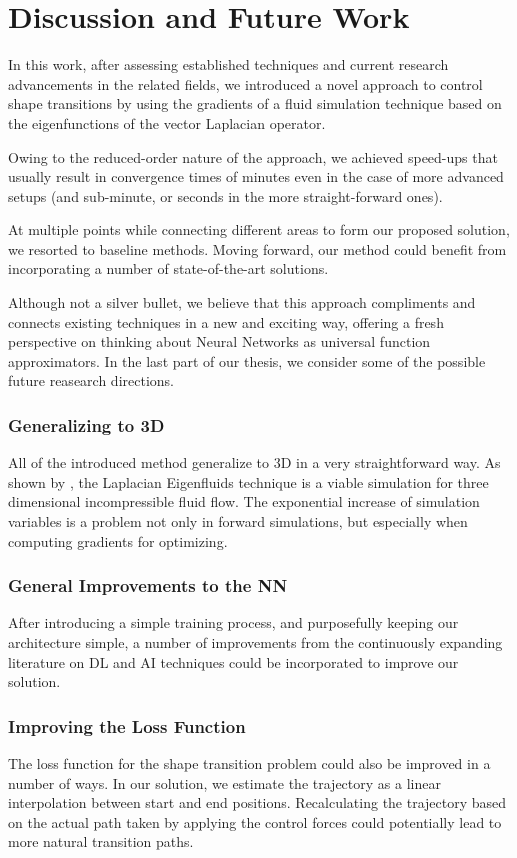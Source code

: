 \chapter{Discussion and Future Work}\label{chapter:discussion}
In this work, after assessing established techniques and current research
advancements in the related fields, we introduced a novel approach to control
shape transitions by using the gradients of a fluid simulation technique based
on the eigenfunctions of the vector Laplacian operator. 

Owing to the reduced-order nature of the approach, we achieved speed-ups that
usually result in convergence times of minutes even in the case of more advanced
setups (and sub-minute, or seconds in the more straight-forward ones).

At multiple points while connecting different areas to form our proposed
solution, we resorted to baseline methods. Moving forward, our method could
benefit from incorporating a number of state-of-the-art solutions.

Although not a silver bullet, we believe that this approach compliments and
connects existing techniques in a new and exciting way, offering a fresh
perspective on thinking about Neural Networks as universal function
approximators. In the last part of our thesis, we consider some of the possible
future reasearch directions. 

\subsection*{Generalizing to 3D}
All of the introduced method generalize to 3D in a very straightforward way. As
shown by \citet{scalable-eigenfluids}, the Laplacian Eigenfluids technique is
a viable simulation for three dimensional incompressible fluid flow. The
exponential increase of simulation variables is a problem not only in forward
simulations, but especially when computing gradients for optimizing. 

\subsection*{General Improvements to the NN}
After introducing a simple training process, and purposefully keeping our
architecture simple, a number of improvements from the continuously expanding
literature on \ac{DL} and \ac{AI} techniques could be incorporated to improve
our solution.

\subsection*{Improving the Loss Function}
The loss function for the shape transition problem could also be improved in
a number of ways. In our solution, we estimate the trajectory as a linear
interpolation between start and end positions. Recalculating the trajectory
based on the actual path taken by applying the control forces could potentially
lead to more natural transition paths.


